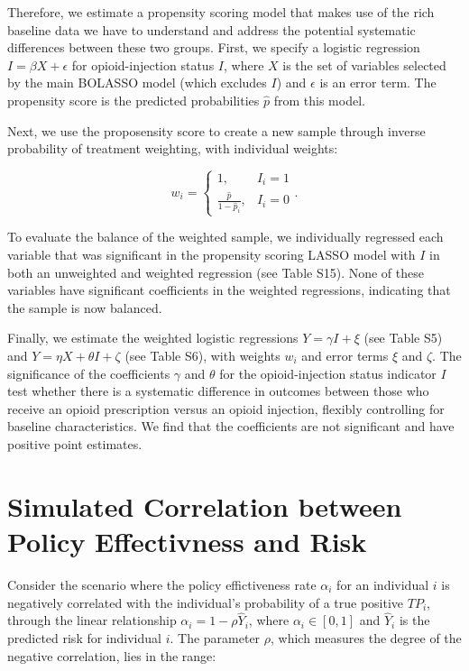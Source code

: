 \documentclass[9pt,twoside]{pnas-new}
\begin{document}
Therefore, we estimate a propensity scoring model that makes use of the rich baseline data we have to understand and address the potential systematic differences between these two groups. First, we specify a logistic regression $I = \beta X + \epsilon$ for opioid-injection status $I$, where $X$ is the set of variables selected by the main BOLASSO model (which excludes $I$) and $\epsilon$ is an error term. The propensity score is the predicted probabilities $\hat{p}$ from this model.

Next, we use the proposensity score to create a new sample through inverse probability of treatment weighting, with individual weights:

\[
w_i =
\begin{cases}
1, & I_i = 1 \\
\frac{\hat{p}}{1 - \hat{p}_i}, & I_i = 0
\end{cases}
.
\]

To evaluate the balance of the weighted sample, we individually regressed each variable that was significant in the propensity scoring LASSO model with $I$ in both an unweighted and weighted regression (see Table S15). None of these variables have significant coefficients in the weighted regressions, indicating that the sample is now balanced.

Finally, we estimate the weighted logistic regressions $Y = \gamma I + \xi$ (see Table S5) and $Y = \eta X + \theta I + \zeta$ (see Table S6), with weights $w_i$ and error terms $\xi$ and $\zeta$. The significance of the coefficients $\gamma$ and $\theta$ for the opioid-injection status indicator $I$ test whether there is a systematic difference in outcomes between those who receive an opioid prescription versus an opioid injection, flexibly controlling for baseline characteristics. We find that the coefficients are not significant and have positive point estimates.

\section{Simulated Correlation between Policy Effectivness and Risk}

Consider the scenario where the policy effictiveness rate $\alpha_i$ for an individual $i$ is negatively correlated with the individual's probability of a true positive $TP_i$, through the linear relationship $\alpha_i = 1 - \rho \hat{Y}_i$, where $\alpha_i \in [0,1]$ and $\hat{Y}_i$ is the predicted risk for individual $i$. The parameter $\rho$, which measures the degree of the negative correlation, lies in the range:
\end{document}

